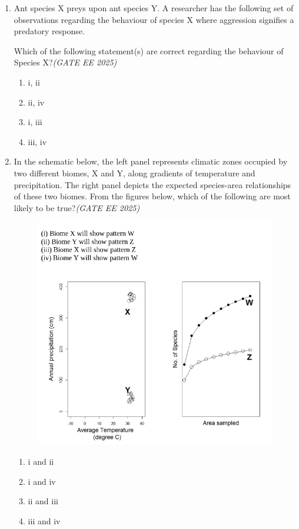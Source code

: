 \begin{enumerate}[leftmargin=*,label=\textbf{Q.\arabic*},resume]
\item Ant species X preys upon ant species Y. A researcher has the following set of observations regarding the behaviour of species X where aggression signifies a predatory response.




Which of the following statement(s) are correct regarding the behaviour of Species X?\hfill \textit{(GATE EE 2025)}
\begin{multicols}{2}
\begin{enumerate}[label=(\Alph*)]
\item i, ii
\item ii, iv
\item i, iii
\item iii, iv
\end{enumerate}
\end{multicols}

\item In the schematic below, the left panel represents climatic zones occupied by two different biomes, X and Y, along gradients of temperature and precipitation. The right panel depicts the expected species-area relationships of these two biomes. From the figures below, which of the following are most likely to be true?\hfill \textit{(GATE EE 2025)}
\vspace{1em}
\begin{figure}[h!]
    \centering
    \includegraphics[width=0.9\linewidth]{figs/imageQ35.png}
\end{figure}
\vspace{1em}
\begin{multicols}{2}
\begin{enumerate}[label=(\Alph*)]
\item i and ii
\item i and iv
\item ii and iii
\item iii and iv
\end{enumerate}
\end{multicols}


\end{enumerate}
